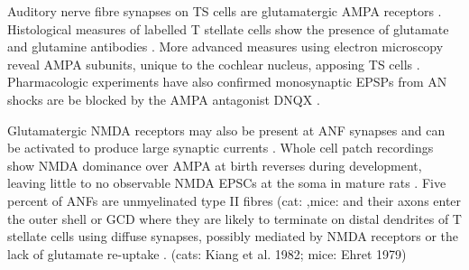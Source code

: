 
 Auditory nerve fibre synapses on TS cells are glutamatergic AMPA receptors
 \citep{FerragamoGoldingEtAl:1998a,WentholdHunterEtAl:1993}.  Histological measures
 of labelled T stellate cells show the presence of glutamate and glutamine antibodies
 \citep{HackneyOsenEtAl:1990,WentholdHunterEtAl:1993}.  More advanced measures using
 electron microscopy reveal AMPA subunits, unique to the cochlear nucleus, apposing
 TS cells \citep{WangWentholdEtAl:1998}.  Pharmacologic experiments have also
 confirmed monosynaptic EPSPs from AN shocks are be blocked by the AMPA antagonist
 DNQX \citep{FerragamoGoldingEtAl:1998a}. 


 Glutamatergic NMDA receptors may also be present at ANF synapses
 \citep[mice][]{FerragamoGoldingEtAl:1998a} and can be activated to produce large
 synaptic currents \citep{CaoOertel:2010}.  Whole cell patch recordings show NMDA
 dominance over AMPA at birth reverses during development, leaving little to no
 observable NMDA EPSCs at the soma in mature rats \citep{BellinghamLimEtAl:1998}.
 Five percent of ANFs are unmyelinated type II fibres (cat: \citep{KiangRhoEtAl:1982},mice: \citep{Ehret:1979} and their axons enter the
 outer shell or GCD where they are likely to terminate on distal dendrites of T
 stellate cells using diffuse synapses, possibly mediated by NMDA receptors or
 the lack of glutamate re-uptake
 \citep{BensonBrown:2004,Ryugo:2008,RyugoHaenggeliEtAl:2003,RyugoParks:2003}.
 (cats: Kiang et al. 1982; mice: Ehret 1979)

